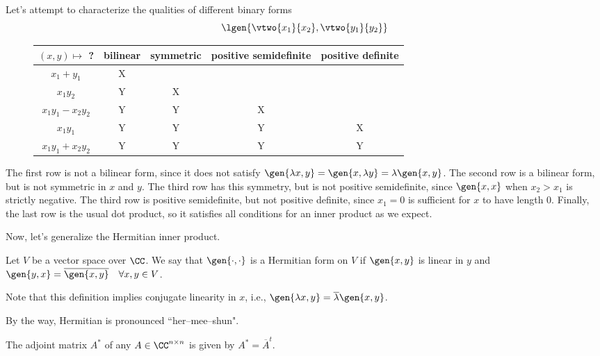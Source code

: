 \begin{example}
\exlabel 

Let's attempt to characterize the qualities of different binary forms
\[\lgen{\vtwo{x_1}{x_2}, \vtwo{y_1}{y_2}}\]
\end{example}

\begin{figure}[h]
\centering
\begin{tabular}{c|c|c|c|c}
    $(x,y)\mapsto$ ? & bilinear & symmetric & positive semidefinite & positive definite \\
\hline
    $x_1+y_1$ & X & & &  \\
    $x_1y_2$ & Y & X & &  \\
    $x_1y_1-x_2y_2$ & Y & Y & X &  \\
    $x_1y_1$ & Y & Y & Y & X\\
    $x_1y_1 + x_2y_2$ & Y & Y & Y & Y
\end{tabular}
\end{figure}

The first row is not a bilinear form, since it does not satisfy $\gen{\lambda x,y} = \gen{x, \lambda y} = \lambda \gen{x,y}$. The second row is a bilinear form, but is not symmetric in $x$ and $y$. The third row has this symmetry, but is not positive semidefinite, since $\gen{x,x}$ when $x_2 > x_1$ is strictly negative. The third row is positive semidefinite, but not positive definite, since $x_1=0$ is sufficient for $x$ to have length $0$. Finally, the last row is the usual dot product, so it satisfies all conditions for an inner product as we expect.  

Now, let's generalize the Hermitian inner product.

\begin{definition}

Let $V$ be a vector space over $\CC$. We say that $\gen{\cdot ,\cdot}$ is a \ac{Hermitian form} on $V$ if $\gen{x,y}$ is linear in $y$ and $\gen{y,x} = \overline{\gen{x,y}}\quad \forall x,y\in V$.
\end{definition}

Note that this definition implies conjugate linearity in $x$, i.e., $\gen{\lambda x,y} = \overline{\lambda}\gen{x,y}$.

By the way, Hermitian is pronounced ``her--mee--shun".

\begin{definition}

The \ac{adjoint} matrix $A^*$ of any $A\in \CC^{n\times n}$ is given by $A^* = \overline{A}^t$.
\end{definition}

